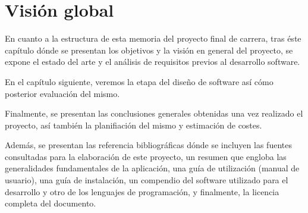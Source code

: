 \section{Visión global}

En cuanto a la estructura de esta memoria del proyecto final de carrera, tras éste capítulo dónde se presentan los objetivos y la visión en general del proyecto, se expone el estado del arte y el análisis de requisitos previos al desarrollo software.

En el capítulo siguiente, veremos la etapa del diseño de software así cómo posterior evaluación del mismo.

Finalmente, se presentan las conclusiones generales obtenidas una vez realizado el proyecto, así también la planifiación del mismo y estimación de costes.

Además, se presentan las referencia bibliográficas dónde se incluyen las fuentes consultadas para la elaboración de este proyecto, un resumen que engloba las generalidades fundamentales de la aplicación, una guía de utilización (manual de usuario), una guía de instalación, un compendio del software utilizado para el desarrollo y otro de los lenguajes de programación, y finalmente, la licencia completa del documento.

